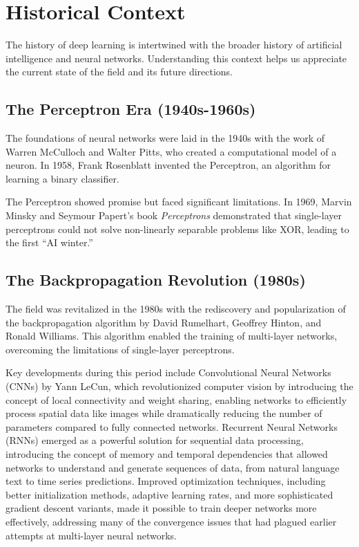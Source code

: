 
\section{Historical Context }
\label{sec:historical-context}

The history of deep learning is intertwined with the broader history of artificial intelligence and neural networks. Understanding this context helps us appreciate the current state of the field and its future directions.

\subsection{The Perceptron Era (1940s-1960s)}

The foundations of neural networks were laid in the 1940s with the work of Warren McCulloch and Walter Pitts, who created a computational model of a neuron. In 1958, Frank Rosenblatt invented the Perceptron, an algorithm for learning a binary classifier.

The Perceptron showed promise but faced significant limitations. In 1969, Marvin Minsky and Seymour Papert's book \emph{Perceptrons} demonstrated that single-layer perceptrons could not solve non-linearly separable problems like XOR, leading to the first ``AI winter.''

\subsection{The Backpropagation Revolution (1980s)}

The field was revitalized in the 1980s with the rediscovery and popularization of the backpropagation algorithm by David Rumelhart, Geoffrey Hinton, and Ronald Williams. This algorithm enabled the training of multi-layer networks, overcoming the limitations of single-layer perceptrons.

Key developments during this period include Convolutional Neural Networks (CNNs) by Yann LeCun, which revolutionized computer vision by introducing the concept of local connectivity and weight sharing, enabling networks to efficiently process spatial data like images while dramatically reducing the number of parameters compared to fully connected networks. Recurrent Neural Networks (RNNs) emerged as a powerful solution for sequential data processing, introducing the concept of memory and temporal dependencies that allowed networks to understand and generate sequences of data, from natural language text to time series predictions. Improved optimization techniques, including better initialization methods, adaptive learning rates, and more sophisticated gradient descent variants, made it possible to train deeper networks more effectively, addressing many of the convergence issues that had plagued earlier attempts at multi-layer neural networks.


